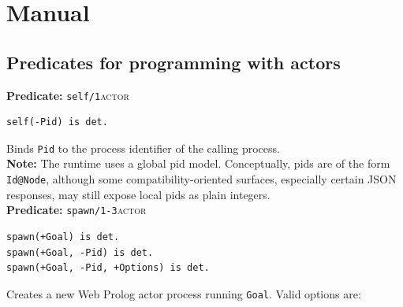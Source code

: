 %

\chapter{Manual}\label{sec:manual}

\section{Predicates for programming with actors}\label{sec:actor-API}

\noindent \textbf{Predicate:} \texttt{self/1}\hfill\textsc{actor}

\begin{verbatim}
self(-Pid) is det.
\end{verbatim}

\noindent Binds \texttt{Pid} to the process identifier of the calling process.\\

\smallskip
\noindent \textbf{Note:} The runtime uses a global pid model. Conceptually,
pids are of the form \texttt{Id@Node}, although some compatibility-oriented
surfaces, especially certain JSON responses, may still expose local pids as
plain integers.\\

\noindent \textbf{Predicate:} \texttt{spawn/1-3}\hfill\textsc{actor}

\begin{verbatim}
spawn(+Goal) is det.
spawn(+Goal, -Pid) is det.
spawn(+Goal, -Pid, +Options) is det.
\end{verbatim}

\noindent Creates a new Web Prolog actor process running \texttt{Goal}. Valid
options are:

